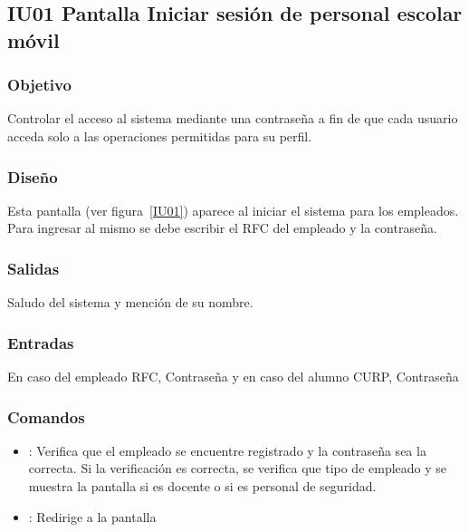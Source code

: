 
\subsection{IU01 Pantalla Iniciar sesión de personal escolar móvil} 

\subsubsection{Objetivo}
	Controlar el acceso al sistema mediante una contraseña a fin de que cada usuario acceda solo a las operaciones permitidas para su perfil.

\subsubsection{Diseño}
	Esta pantalla  (ver figura~\ref{IU01}) aparece al iniciar el sistema para los empleados. Para ingresar al mismo se debe escribir el RFC del empleado y la contraseña. 


\subsubsection{Salidas}

Saludo del sistema y mención de su nombre.

\subsubsection{Entradas}
En caso del empleado RFC, Contraseña y en caso del alumno CURP, Contraseña

\subsubsection{Comandos}
\begin{itemize}
	\item {}: Verifica que el empleado se encuentre registrado y la contraseña sea la correcta. Si la verificación es correcta, se verifica que tipo de empleado y se muestra la pantalla  si es docente o  si es personal de seguridad.
	
	\item {}: Redirige a la pantalla 
	
\end{itemize}

